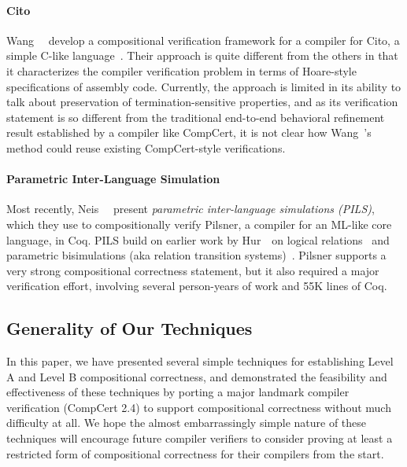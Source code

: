 \paragraph{Cito}

Wang~\etal~\cite{cito} develop a compositional verification framework
for a compiler for Cito, a simple C-like language~\cite{cito}.  Their
approach is quite different from the others in that it characterizes
the compiler verification problem in terms of Hoare-style
specifications of assembly code.  Currently, the approach is limited
in its ability to talk about preservation of termination-sensitive
properties, and as its verification statement is so different from the
traditional end-to-end behavioral refinement result established by a
compiler like \mbox{CompCert}, it is not clear how Wang~\etal's method
could reuse existing CompCert-style verifications.

\paragraph{Parametric Inter-Language Simulation}

Most recently, Neis~\etal~\cite{neis+:icfp15} present \emph{parametric
  inter-language simulations (PILS)}, which they use to
compositionally verify Pilsner, a compiler for an ML-like core
language, in Coq.  PILS build on earlier work by Hur~\etal\ on logical
relations~\cite{benton+:icfp09,hur+:popl11} and parametric
bisimulations (aka relation transition
systems)~\cite{hur+:popl12,rts-trans}.  Pilsner supports a very strong
compositional correctness statement, but it also required a major
verification effort, involving several person-years of work and 55K
lines of Coq.


\subsection{Generality of Our Techniques}

In this paper, we have presented several simple techniques for
establishing Level A and Level B compositional correctness, and
demonstrated the feasibility and effectiveness of these techniques by
porting a major landmark compiler verification (CompCert 2.4) to
support compositional correctness without much difficulty at all.  We
hope the almost embarrassingly simple nature of these techniques will
encourage future compiler verifiers to consider proving at least a
restricted form of compositional correctness for their compilers from
the start.

